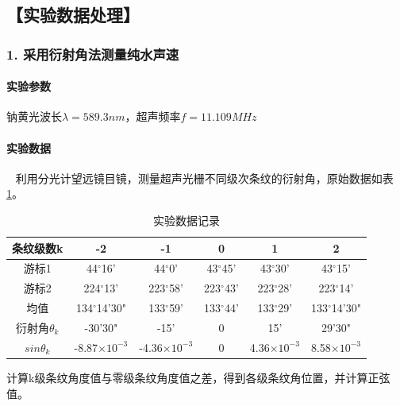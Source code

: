 \documentclass[12pt,a4paper,UTF8]{ctexart}
\begin{document}
\subsection*{【实验数据处理】}

\subsubsection*{1. 采用衍射角法测量纯水声速}
		\paragraph{实验参数} 钠黄光波长$\lambda = 589.3 nm$，超声频率$f = 11.109 MHz$
		\paragraph{实验数据}~
		\newline
		\indent
		利用分光计望远镜目镜，测量超声光栅不同级次条纹的衍射角，原始数据如表\ref{tab:1}。

\begin{table}[htbp]
	\centering
	\caption{实验数据记录}
	\begin{tabular}{cccccc}
	\toprule
	条纹级数k    & -2 & -1  & 0 & 1 & 2 \\
	\midrule
	游标1     & 44$^{\circ}$16' & 44$^{\circ}$0' & 43$^{\circ}$45'&  43$^{\circ}$30'   & 43$^{\circ}$15'\\
	游标2     & 224$^{\circ}$13' & 223$^{\circ}$58' & 223$^{\circ}$43' & 223$^{\circ}$28' & 223$^{\circ}$14' \\
	均值      & 134$^{\circ}$14'30" & 133$^{\circ}$59' & 133$^{\circ}$44' & 133$^{\circ}$29' & 133$^{\circ}$14'30"\\
	衍射角$\theta_k$    & -30'30" & -15' & 0 & 15' & 29'30" \\
	$sin\theta_k$    &   -8.87$\times 10^{-3}$ & -4.36$\times 10^{-3}$ & 0 &4.36$\times 10^{-3}$ & 8.58$\times 10^{-3}$ \\
	\bottomrule
	\end{tabular}%
	\label{tab:1}%
\end{table}%


		计算k级条纹角度值与零级条纹角度值之差，得到各级条纹角位置，并计算正弦值。
		
\end{document}
